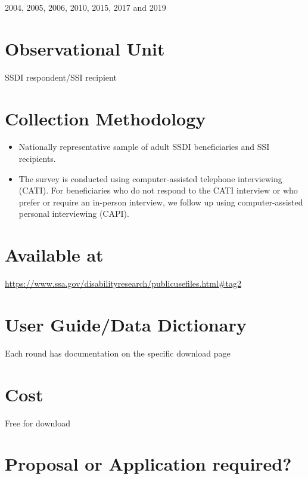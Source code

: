 \documentclass[
]{book}
\providecommand{\tightlist}{%
  \setlength{\itemsep}{0pt}\setlength{\parskip}{0pt}}
\begin{document}
2004, 2005, 2006, 2010, 2015, 2017 and 2019

\hypertarget{observational-unit-43}{%
\section{Observational Unit}\label{observational-unit-43}}

SSDI respondent/SSI recipient

\hypertarget{collection-methodology-43}{%
\section{Collection Methodology}\label{collection-methodology-43}}

\begin{itemize}
\tightlist
\item
  Nationally representative sample of adult SSDI beneficiaries and SSI recipients.
\item
  The survey is conducted using computer-assisted telephone interviewing (CATI). For beneficiaries who do not respond to the CATI interview or who prefer or require an in-person interview, we follow up using computer-assisted personal interviewing (CAPI).
\end{itemize}

\hypertarget{available-at-43}{%
\section{Available at}\label{available-at-43}}

\url{https://www.ssa.gov/disabilityresearch/publicusefiles.html\#tag2}

\hypertarget{user-guidedata-dictionary-43}{%
\section{User Guide/Data Dictionary}\label{user-guidedata-dictionary-43}}

Each round has documentation on the specific download page

\hypertarget{cost-43}{%
\section{Cost}\label{cost-43}}

Free for download

\hypertarget{proposal-or-application-required-43}{%
\section{Proposal or Application required?}\label{proposal-or-application-required-43}}
\end{document}
